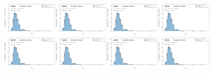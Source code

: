 \begin{figure}[h!]
\includegraphics[width=0.25\textwidth,page=9]{figures/SimResults/MultiFoldTotalErrors.pdf}\includegraphics[width=0.25\textwidth,page=10]{figures/SimResults/MultiFoldTotalErrors.pdf}\includegraphics[width=0.25\textwidth,page=11]{figures/SimResults/MultiFoldTotalErrors.pdf}\includegraphics[width=0.25\textwidth,page=12]{figures/SimResults/MultiFoldTotalErrors.pdf}\\
\includegraphics[width=0.25\textwidth,page=13]{figures/SimResults/MultiFoldTotalErrors.pdf}\includegraphics[width=0.25\textwidth,page=14]{figures/SimResults/MultiFoldTotalErrors.pdf}\includegraphics[width=0.25\textwidth,page=15]{figures/SimResults/MultiFoldTotalErrors.pdf}\includegraphics[width=0.25\textwidth,page=16]{figures/SimResults/MultiFoldTotalErrors.pdf}\\

\end{figure}
